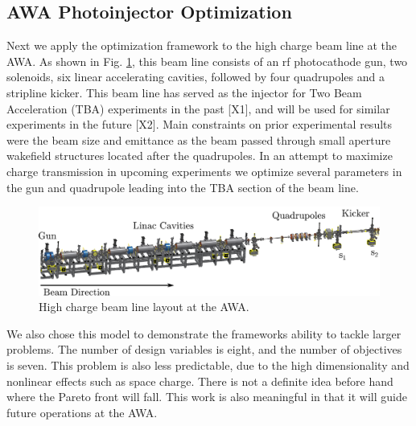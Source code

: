 \subsection{AWA Photoinjector Optimization} \label{awaproblem}
Next we apply the optimization framework to the high charge beam line at the AWA. 
As shown in Fig.  \ref{awa-pic}, this beam line consists of an rf photocathode gun, 
two solenoids, six linear accelerating cavities, 
followed by four quadrupoles and a stripline kicker. 
This beam line has served as the injector for Two Beam 
Acceleration (TBA) experiments in the past [X1], and will be used for 
similar experiments in the future [X2]. Main constraints on prior experimental 
results were the beam size and emittance as the beam passed through small aperture 
wakefield structures located after the quadrupoles. 
In an attempt to maximize charge transmission in upcoming experiments
we optimize several parameters in the gun and quadrupole leading into the 
TBA section of the beam line.

\begin{figure}
	\centering
	\includegraphics[width=0.9\linewidth]{Report/awa-drawing}
	\caption{High charge beam line layout at the AWA.}
	\label{awa-pic}
\end{figure}

We also chose this model to demonstrate the frameworks ability to tackle larger problems.
The number of design variables is eight, and the number of objectives is seven.
This problem is also less predictable, due to the high dimensionality 
and nonlinear effects such as space charge. There is not a definite idea
before hand where the Pareto front will fall. This work is also meaningful in that
it will guide future operations at the AWA.

